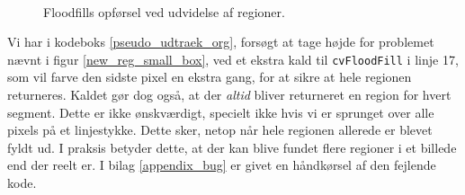 {\begin{figure}[p]
    \setlength\fboxsep{0pt}
    \setlength\fboxrule{0.5pt}
    \centering
    \\
    \caption[]{
    Floodfills opførsel ved udvidelse af regioner.
    }
    \label{floodfill_return_entire_region}
\end{figure}

Vi har i kodeboks \ref{pseudo_udtraek_org}, forsøgt at tage højde for
problemet nævnt i figur \ref{new_reg_small_box}, ved et ekstra kald til
\texttt{cvFloodFill} i linje 17, som vil farve den sidste pixel en
ekstra gang, for at sikre at hele regionen returneres. Kaldet gør dog
også, at der \emph{altid} bliver returneret en region for hvert segment.
Dette er ikke ønskværdigt, specielt ikke hvis vi er sprunget over alle
pixels på et linjestykke. Dette sker, netop når hele regionen allerede
er blevet fyldt ud. I praksis betyder dette, at der kan blive fundet
flere regioner i et billede end der reelt er. I bilag \ref{appendix_bug}
er givet en håndkørsel af den fejlende kode.

}
